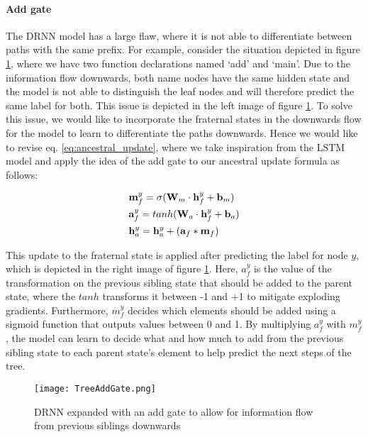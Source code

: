 \paragraph{Add gate} The DRNN model has a large flaw, where it is not able to differentiate between paths with the same prefix. For example, consider the situation depicted in figure \ref{fig:treeAddGate}, where we have two function declarations named `add' and `main'. Due to the information flow downwards, both name nodes have the same hidden state and the model is not able to distinguish the leaf nodes and will therefore predict the same label for both. This issue is depicted in the left image of figure \ref{fig:treeAddGate}. To solve this issue, we would like to incorporate the fraternal states in the downwards flow for the model to learn to differentiate the paths downwards. Hence we would like to revise eq. \ref{eq:ancestral_update}, where we take inspiration from the LSTM model and apply the idea of the add gate to our ancestral update formula as follows:

\begin{align}
    &\mathbf{m}_f^y = \sigma(\mathbf{W}_m \cdot \mathbf{h}_f^y + \mathbf{b}_m)\\
    &\mathbf{a}_f^y = tanh(\mathbf{W}_a \cdot \mathbf{h}_f^y + \mathbf{b}_a)\\
    &\mathbf{h}_a^y = \mathbf{h}_a^y + (\mathbf{a}_f * \mathbf{m}_f)
\end{align}

This update to the fraternal state is applied after predicting the label for node $y$, which is depicted in the right image of figure \ref{fig:treeAddGate}. Here, $a_f^y$ is the value of the transformation on the previous sibling state that should be added to the parent state, where the $tanh$ transforms it between -1 and +1 to mitigate exploding gradients. Furthermore, $m_f^y$ decides which elements should be added using a sigmoid function that outputs values between 0 and 1. By multiplying $a_f^y$ with $m_f^y$, the model can learn to decide what and how much to add from the previous sibling state to each parent state's element to help predict the next steps of the tree.


\begin{figure}[ht!]
    \centering
    \texttt{[image: TreeAddGate.png]}
    \caption{DRNN expanded with an add gate to allow for information flow from previous siblings downwards}
    \label{fig:treeAddGate}
\end{figure}

